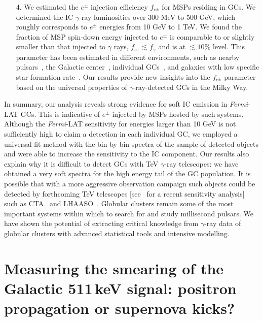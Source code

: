 \documentclass[doublespace,nopageskip]{VTthesis} %
\begin{document}
\begin{itemize}
    \item[4.] We estimated the $e^\pm$ injection efficiency $f_{e^\pm}$ for MSPs residing in GCs. We determined the IC $\gamma$-ray luminosities over 300 MeV to 500 GeV, which roughly corresponds to $e^\pm$ energies from 10 GeV to 1 TeV. We found the fraction of MSP spin-down energy injected to $e^\pm$ is comparable to or slightly smaller than that injected to $\gamma$ rays, $f_{e^\pm} \lesssim f_\gamma$ and is at $\lesssim 10\%$ level. This parameter has been estimated in different environments, such as {nearby pulsars~\citep{2017PhRvD..96j3013H, 2018PhRvD..98d3005H, 2021arXiv210400014H}}, the Galactic center~\citep{2013MNRAS.435L..14B}, individual GCs~\citep{2019MNRAS.484.2876M}, and galaxies with low specific star formation rate~\citep{2020arXiv200508982S}. Our results provide new insights into the $f_{e^\pm}$ parameter based on the universal properties of $\gamma$-ray-detected GCs in the Milky Way.
\end{itemize}

In summary, our analysis reveals strong evidence for {soft} IC emission in \textit{Fermi}-LAT GCs. This is indicative of $e^\pm$ injected by MSPs hosted by such systems. Although the {\it Fermi}-LAT sensitivity for energies larger than 10 GeV is not sufficiently high to claim a detection in each individual GC, we employed a universal fit method with the bin-by-bin spectra of the sample of detected objects and were able to increase the sensitivity to the IC component. Our results also explain why it is difficult to detect GCs with TeV $\gamma$-ray telescopes: we have obtained a very soft spectra for the high energy tail of the GC population. It is possible that with a more aggressive observation campaign such objects could be detected by forthcoming TeV telescopes [see~\citep{2018MNRAS.473..897N} for a recent sensitivity analysis] such as CTA~\citep{2019scta.book.....C} and LHAASO~\citep{2019arXiv190502773B}. Globular clusters remain some of the most important systems within which to search for and study millisecond pulsars. We have shown the potential of extracting critical knowledge from $\gamma$-ray data of globular clusters with advanced statistical tools and intensive modelling. 

\chapter{Measuring the smearing of the Galactic 511\,keV signal: positron propagation or supernova kicks?} \label{ch:511keV}
\end{document}
